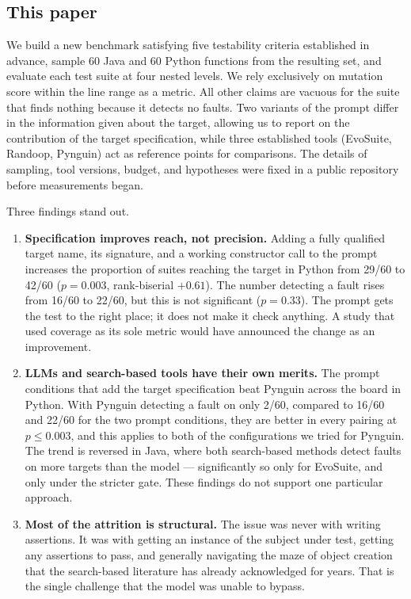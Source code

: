 \subsection*{This paper}

We build a new benchmark satisfying five testability criteria established in advance, sample
60 Java and 60 Python functions from the resulting set, and evaluate each test suite at four
nested levels. We rely exclusively on mutation score within the line range as a metric. All
other claims are vacuous for the suite that finds nothing because it detects no faults. Two
variants of the prompt differ in the information given about the target, allowing us to report
on the contribution of the target specification, while three established tools (EvoSuite,
Randoop, Pynguin) act as reference points for comparisons. The details of sampling, tool
versions, budget, and hypotheses were fixed in a public repository before measurements began.

Three findings stand out.

\begin{enumerate}
  \item \textbf{Specification improves reach, not precision.}
    Adding a fully qualified target name, its signature, and a working constructor call to
    the prompt increases the proportion of suites reaching the target in Python from 29/60 to
    42/60 ($p = 0.003$, rank-biserial $+0.61$). The number detecting a fault rises from 16/60
    to 22/60, but this is not significant ($p = 0.33$). The prompt gets the test to the right
    place; it does not make it check anything. A study that used coverage as its sole metric
    would have announced the change as an improvement.
  \item \textbf{LLMs and search-based tools have their own merits.}
    The prompt conditions that add the target specification beat Pynguin across the board in
    Python. With Pynguin detecting a fault on only 2/60, compared to 16/60 and 22/60 for the
    two prompt conditions, they are better in every pairing at $p \le 0.003$, and this applies
    to both of the configurations we tried for Pynguin. The trend is reversed in Java, where
    both search-based methods detect faults on more targets than the model --- significantly
    so only for EvoSuite, and only under the stricter gate. These findings do not support one
    particular approach.
  \item \textbf{Most of the attrition is structural.}
    The issue was never with writing assertions. It was with getting an instance of the
    subject under test, getting any assertions to pass, and generally navigating the maze of
    object creation that the search-based literature has already acknowledged for years. That
    is the single challenge that the model was unable to bypass.
\end{enumerate}

